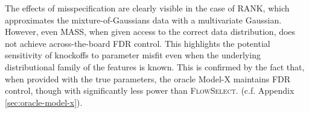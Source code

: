 \documentclass{article}
\newcommand{\FlowSelect}{\textsc{FlowSelect}\xspace}
\newcommand{\FlowSelectNS}{\textsc{FlowSelect}}
\begin{document}
The effects of misspecification are clearly visible in the case of RANK, which approximates the mixture-of-Gaussians data with a multivariate Gaussian.
However, even MASS, when given access to the correct  data distribution, does not achieve across-the-board FDR control.
This highlights the potential sensitivity of knockoffs to parameter misfit even when the underlying distributional family of the features is known.
This is confirmed by the fact that, when provided with the true parameters, the oracle Model-X maintains FDR control, though with significantly less power than \FlowSelectNS.
(c.f. Appendix \ref{sec:oracle-model-x}).





\end{document}
